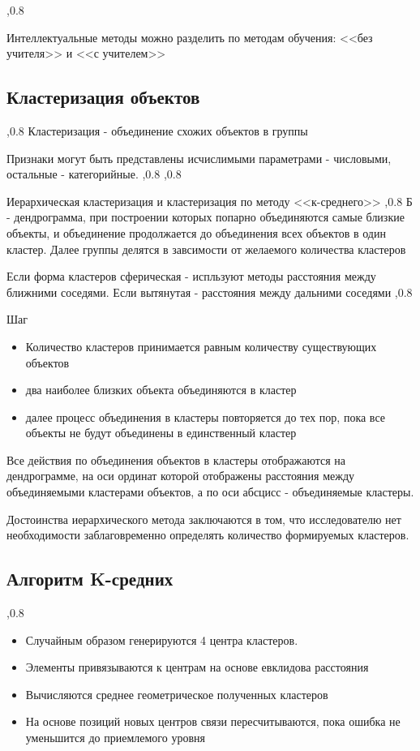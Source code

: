\documentclass[a4paper,12pt]{report}
\begin{document}
	,0.8

	Интеллектуальные методы можно разделить по методам обучения: <<без учителя>> и <<с учителем>>

	\subsection{Кластеризация объектов}
		,0.8
		Кластеризация - объединение схожих объектов в группы

		Признаки могут быть представлены исчислимыми параметрами - числовыми, остальные - категорийные.
		,0.8
		,0.8

		Иерархическая кластеризация и кластеризация по методу <<к-среднего>>
		,0.8
		Б - дендрограмма, при построении которых попарно объединяются самые близкие объекты, и объединение продолжается до объединения всех объектов в один кластер.
		Далее группы делятся в завсимости от желаемого количества кластеров

		Если форма кластеров сферическая - испльзуют методы расстояния между ближними соседями.
		Если вытянутая - расстояния между дальними соседями
		,0.8 %

		Шаг
		\begin{itemize}
			\item Количество кластеров принимается равным количеству существующих объектов
			\item два наиболее близких объекта объединяются в кластер
			\item далее процесс объединения в кластеры повторяется до тех пор, пока все объекты не будут объединены в единственный кластер
		\end{itemize}

		Все действия по объединения объектов в кластеры отображаются на дендрограмме, на оси ординат которой отображены расстояния между объединяемыми кластерами объектов, а по оси абсцисс - объединяемые кластеры.

		Достоинства иерархического метода заключаются в том, что исследователю нет необходимости заблаговременно определять количество формируемых кластеров.

	\subsection{Алгоритм K-средних }
		,0.8
		\begin{itemize}
			\item Случайным образом генерируются 4 центра кластеров.
			\item Элементы привязываются к центрам на основе евклидова расстояния
			\item Вычисляются среднее геометрическое полученных кластеров
			\item На основе позиций новых центров связи пересчитываются, пока ошибка не уменьшится до приемлемого уровня
		\end{itemize}
\end{document}
